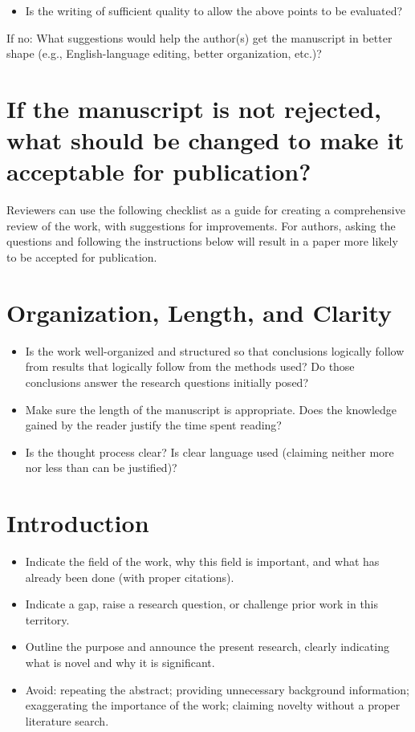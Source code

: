 \begin{itemize}
  \item Is the writing of sufficient quality to allow the above points to be evaluated?
\end{itemize}

If no: What suggestions would help the author(s) get the manuscript in better shape (e.g., English-language editing, better organization, etc.)?

\section*{If the manuscript is not rejected, what should be changed to make it acceptable for publication?}
Reviewers can use the following checklist as a guide for creating a comprehensive review of the work, with suggestions for improvements. For authors, asking the questions and following the instructions below will result in a paper more likely to be accepted for publication.

\section*{Organization, Length, and Clarity}
\begin{itemize}
  \item Is the work well-organized and structured so that conclusions logically follow from results that logically follow from the methods used? Do those conclusions answer the research questions initially posed?
  \item Make sure the length of the manuscript is appropriate. Does the knowledge gained by the reader justify the time spent reading?
  \item Is the thought process clear? Is clear language used (claiming neither more nor less than can be justified)?
\end{itemize}

\section*{Introduction}
\begin{itemize}
  \item Indicate the field of the work, why this field is important, and what has already been done (with proper citations).
  \item Indicate a gap, raise a research question, or challenge prior work in this territory.
  \item Outline the purpose and announce the present research, clearly indicating what is novel and why it is significant.
  \item Avoid: repeating the abstract; providing unnecessary background information; exaggerating the importance of the work; claiming novelty without a proper literature search.
\end{itemize}

